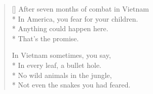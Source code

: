\label{ch:jungle}
\settowidth{\versewidth}{In America, you fear for your children.}
\begin{verse}[\versewidth]
After seven months of combat in Vietnam\\*
In America, you fear for your children.\\*
Anything could happen here.\\*
That's the promise.

In Vietnam sometimes, you say,\\*
In every leaf, a bullet hole.\\*
No wild animals in the jungle,\\*
Not even the snakes you had feared.
\end{verse}
